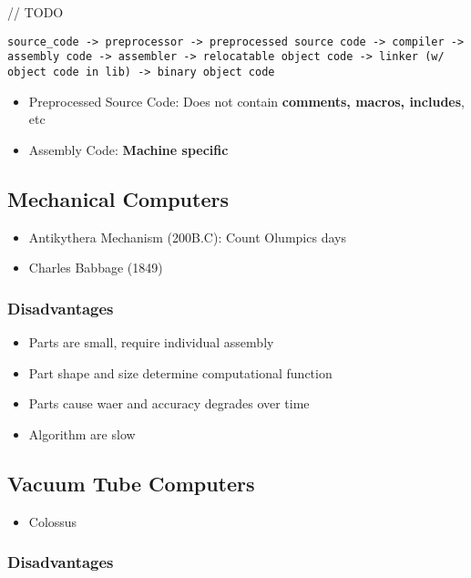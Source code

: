 \documentclass[11pt]{article}
\begin{document}
// TODO
\begin{verbatim}
source_code -> preprocessor -> preprocessed source code -> compiler -> assembly code -> assembler -> relocatable object code -> linker (w/ object code in lib) -> binary object code
\end{verbatim}

\begin{itemize}
\item Preprocessed Source Code: Does not contain \textbf{comments, macros, includes}, etc
\item Assembly Code: \textbf{Machine specific}
\end{itemize}

\subsection{Mechanical Computers}
\label{sec:org2d1f3b9}

\begin{itemize}
\item Antikythera Mechanism (200B.C): Count Olumpics days
\item Charles Babbage (1849)
\end{itemize}

\subsubsection{Disadvantages}
\label{sec:org05388cc}

\begin{itemize}
\item Parts are small, require individual assembly
\item Part shape and size determine computational function
\item Parts cause waer and accuracy degrades over time
\item Algorithm are slow
\end{itemize}

\subsection{Vacuum Tube Computers}
\label{sec:org248702e}

\begin{itemize}
\item Colossus
\end{itemize}

\subsubsection{Disadvantages}
\label{sec:org043bd06}
\end{document}
